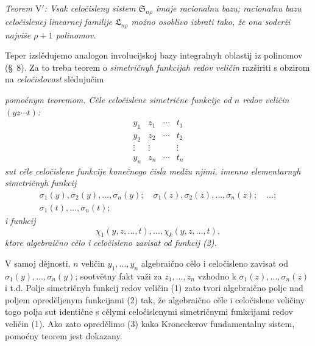 \documentclass[11pt]{article}
\providecommand{\Ssys}{\mathfrak{S}}
\providecommand{\Lsys}{\mathfrak{L}}
\begin{document}
{\itshape Teorem $\mathrm{V}'$: Vsak celočisleny sistem $\Ssys_{n\rho}$ imaje racionalnu bazu; racionalnu bazu celočislenej linearnej familije $\Lsys_{n\rho}$ možno osoblivo izbrati tako, že ona soderži najviše $\rho+1$ polinomov.}

Teper izslědujemo analogon involucijskoj bazy integralnyh oblastij iz polinomov (\S\ 8). Za to treba teorem o {\itshape simetričnyh funkcijah redov veličin} razširiti s obzirom na {\itshape celočislovost} slědujučim

{\itshape pomoćnym teoremom. Cěle celočislene simetrične funkcije od $n$ redov veličin $(yz\cdots t)$:}
\begin{equation}
\begin{array}{cccc}
  y_1&z_1&\cdots&t_1\\
  y_2&z_2&\cdots&t_2\\
  \vdots&\vdots&&\vdots\\
  y_n&z_n&\cdots&t_n
\end{array}
\tag{1}
\end{equation}
{\itshape sut cěle celočislene funkcije konečnogo čisla medžu njimi, imenno elementarnyh simetričnyh funkcij}
\begin{equation}
\begin{gathered}
  \sigma_1(y),\sigma_2(y),\ldots,\sigma_n(y);\quad
  \sigma_1(z),\sigma_2(z),\ldots,\sigma_n(z);\quad\ldots;\\
  \sigma_1(t),\ldots,\sigma_n(t);
\end{gathered}
\tag{2}
\end{equation}
{\itshape i funkcij}
\begin{equation}
  \chi_1(y,z,\ldots,t),\ldots,\chi_k(y,z,\ldots,t),
\tag{3}
\end{equation}
{\itshape ktore algebraično cělo i celočisleno zavisat od funkcij (2).}

V samoj dějnosti, $n$ veličin $y_1,\ldots,y_n$ algebraično cělo i celočisleno zavisat od $\sigma_1(y),\ldots,\sigma_n(y)$; sootvětny fakt važi za $z_1,\ldots,z_n$ vzhodno k $\sigma_1(z),\ldots,\sigma_n(z)$ i t.d. Polje simetričnyh funkcij redov veličin (1) zato tvori algebraično polje nad poljem opreděljenym funkcijami (2) tak, že algebraično cěle i celočislene veličiny togo polja sut identične s cělymi celočislenymi simetričnymi funkcijami redov veličin (1). Ako zato opredělimo (3) kako Kroneckerov fundamentalny sistem, pomoćny teorem jest dokazany.
\end{document}

